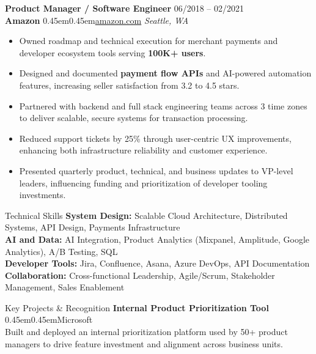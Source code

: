 \documentclass[10pt, letterpaper]{article}
\makeatletter
\renewcommand{\section}{%
  \@startsection{section}{1}{\z@}{10pt}{6pt}{%
    \Large\bfseries\color{black}%
  }%
}
\newcommand{\bull}{\kern0.45em\textbullet\kern0.45em}
\newcommand{\role}[1]{\textbf{#1}}
\newcommand{\org}[1]{\textbf{#1}}
\newcommand{\place}[1]{\textit{#1}}
\makeatother
\begin{document}
\role{Product Manager / Software Engineer} \hfill 06/2018 -- 02/2021 \\
\org{Amazon} \bull \href{https://www.amazon.com}{amazon.com} \hfill \place{Seattle, WA}
\begin{itemize}
  \item Owned roadmap and technical execution for merchant payments and developer ecosystem tools serving \textbf{100K+ users}.
  \item Designed and documented \textbf{payment flow APIs} and AI-powered automation features, increasing seller satisfaction from 3.2 to 4.5 stars.
  \item Partnered with backend and full stack engineering teams across 3 time zones to deliver scalable, secure systems for transaction processing.
  \item Reduced support tickets by 25\% through user-centric UX improvements, enhancing both infrastructure reliability and customer experience.
  \item Presented quarterly product, technical, and business updates to VP-level leaders, influencing funding and prioritization of developer tooling investments.
\end{itemize}
\vspace{12pt}

\section{Technical Skills}
\textbf{System Design:} Scalable Cloud Architecture, Distributed Systems, API Design, Payments Infrastructure \\
\textbf{AI and Data:} AI Integration, Product Analytics (Mixpanel, Amplitude, Google Analytics), A/B Testing, SQL \\
\textbf{Developer Tools:} Jira, Confluence, Asana, Azure DevOps, API Documentation \\
\textbf{Collaboration:} Cross-functional Leadership, Agile/Scrum, Stakeholder Management, Sales Enablement

\section{Key Projects \& Recognition}
\textbf{Internal Product Prioritization Tool} \bull Microsoft \\
Built and deployed an internal prioritization platform used by 50+ product managers to drive feature investment and alignment across business units.
\end{document}
